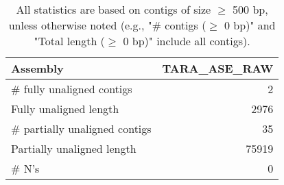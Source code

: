 \documentclass[12pt,a4paper]{article}
\begin{document}
\begin{table}[ht]
\begin{center}
\caption{All statistics are based on contigs of size $\geq$ 500 bp, unless otherwise noted (e.g., "\# contigs ($\geq$ 0 bp)" and "Total length ($\geq$ 0 bp)" include all contigs).}
\begin{tabular}{|l*{1}{|r}|}
\hline
Assembly & TARA\_ASE\_RAW \\ \hline
\# fully unaligned contigs & 2 \\ \hline
Fully unaligned length & 2976 \\ \hline
\# partially unaligned contigs & 35 \\ \hline
Partially unaligned length & 75919 \\ \hline
\# N's & 0 \\ \hline
\end{tabular}
\end{center}
\end{table}
\end{document}
